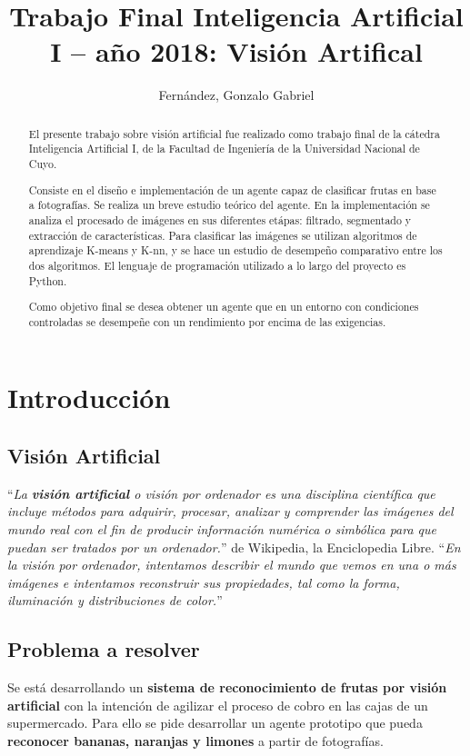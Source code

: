 \documentclass[10pt,a4paper]{article}
\author{Fernández, Gonzalo Gabriel}
\title{Trabajo Final Inteligencia Artificial I – año 2018: Visión Artifical}
\begin{document}
\maketitle

\begin{abstract}
El presente trabajo sobre visión artificial fue realizado como trabajo final de la cátedra Inteligencia Artificial I, de la Facultad de Ingeniería de la Universidad Nacional de Cuyo.

Consiste en el diseño e implementación de un agente capaz de clasificar frutas en base a fotografías. Se realiza un breve estudio teórico del agente. En la implementación se analiza el procesado de imágenes en sus diferentes etápas: filtrado, segmentado y extracción de características. Para clasificar las imágenes se utilizan algoritmos de aprendizaje K-means y K-nn, y se hace un estudio de desempeño comparativo entre los dos algoritmos. El lenguaje de programación utilizado a lo largo del proyecto es Python.

Como objetivo final se desea obtener un agente que en un entorno con condiciones controladas se desempeñe con un rendimiento por encima de las exigencias.
\end{abstract}

\section{Introducción}

\subsection{Visión Artificial\label{vision}}
``\textit{La \textbf{visión artificial} o visión por ordenador es una disciplina científica que incluye métodos para adquirir, procesar, analizar y comprender las imágenes del mundo real con el fin de producir información numérica o simbólica para que puedan ser tratados por un ordenador.}'' de Wikipedia, la Enciclopedia Libre.
``\textit{En la visión por ordenador, intentamos describir el mundo que vemos en una o más imágenes e intentamos reconstruir sus propiedades, tal como la forma, iluminación y distribuciones de color.}'' \textcite{szeliski}

\subsection{Problema a resolver}
Se está desarrollando un \textbf{sistema de reconocimiento de frutas por visión artificial} con la intención de agilizar el proceso de cobro en las cajas de un supermercado. Para ello se
pide desarrollar un agente prototipo que pueda \textbf{reconocer bananas, naranjas y limones} a partir de fotografías.
\end{document}
